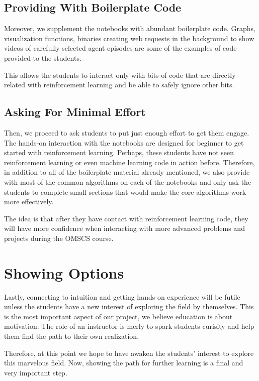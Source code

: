 \documentclass[11pt]{article} %
\begin{document}
\subsection{Providing With Boilerplate Code}

Moreover, we supplement the notebooks with abundant boilerplate code. Graphs,
visualization functions, binaries creating web requests in the background to
show videos of carefully selected agent episodes are some of the examples of
code provided to the students.

This allows the students to interact only with bits of code that are directly
related with reinforcement learning and be able to safely ignore other bits.

\subsection{Asking For Minimal Effort}

Then, we proceed to ask students to put just enough effort to get them engage.
The hands-on interaction with the notebooks are designed for beginner to get
started with reinforcement learning. Perhaps, these students have not seen
reinforcement learning or even machine learning code in action before. Therefore,
in addition to all of the boilerplate material already mentioned, we also
provide with most of the common algorithms on each of the notebooks and
only ask the students to complete small sections that would make the core
algorithms work more effectively.

The idea is that after they have contact with reinforcement learning code, they
will have more confidence when interacting with more advanced problems and
projects during the OMSCS course.

\section{Showing Options}

Lastly, connecting to intuition and getting hands-on experience will be
futile unless the students have a new interest of exploring the field by
themselves. This is the most important aspect of our project, we believe
education is about motivation. The role of an instructor is merly to spark
students curisity and help them find the path to their own realization.

Therefore, at this point we hope to have awaken the students' interest to
explore this marvelous field. Now, showing the path for further learning is
a final and very important step.
\end{document}

